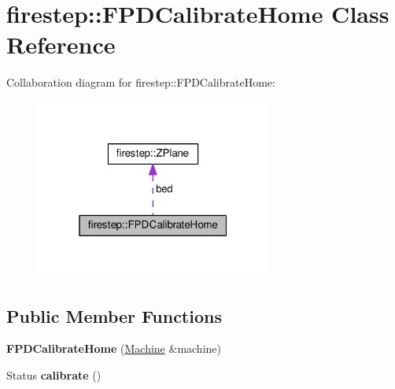 \hypertarget{classfirestep_1_1_f_p_d_calibrate_home}{\section{firestep\+:\+:F\+P\+D\+Calibrate\+Home Class Reference}
\label{classfirestep_1_1_f_p_d_calibrate_home}
}


Collaboration diagram for firestep\+:\+:F\+P\+D\+Calibrate\+Home\+:
\nopagebreak
\begin{figure}[H]
\begin{center}
\leavevmode
\includegraphics[width=220pt]{classfirestep_1_1_f_p_d_calibrate_home__coll__graph}
\end{center}
\end{figure}
\subsection*{Public Member Functions}
\begin{DoxyCompactItemize}
\item 
\hypertarget{classfirestep_1_1_f_p_d_calibrate_home_a8584d79396fc70f8da0f4be97f0c6d40}{{\bfseries F\+P\+D\+Calibrate\+Home} (\hyperlink{classfirestep_1_1_machine}{Machine} \&machine)}\label{classfirestep_1_1_f_p_d_calibrate_home_a8584d79396fc70f8da0f4be97f0c6d40}

\item 
\hypertarget{classfirestep_1_1_f_p_d_calibrate_home_a37321b6559900418ae63791560aef26a}{Status {\bfseries calibrate} ()}\label{classfirestep_1_1_f_p_d_calibrate_home_a37321b6559900418ae63791560aef26a}

\end{DoxyCompactItemize}

